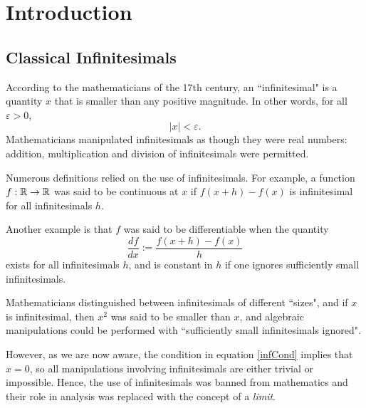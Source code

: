 
\chapter{Introduction} %

\label{Introduction} %



\section{Classical Infinitesimals}
According to the mathematicians of the 17th century, an ``infinitesimal"
is a quantity $x$ that is smaller than any positive magnitude. In other
words, for all $\varepsilon > 0$, 
\begin{equation}
\label{infCond}
    |x| < \varepsilon.
\end{equation}
Mathematicians manipulated infinitesimals
as though they were real numbers: addition, multiplication and division of infinitesimals
were permitted. 

Numerous definitions relied on the use of infinitesimals. For example,
a function $f:\mathbb{R}\rightarrow \mathbb{R}$ was said to be continuous at $x$
if $f(x+h)-f(x)$ is infinitesimal for all infinitesimals $h$.

Another example is that $f$ was said to be differentiable when the quantity
\begin{equation}
    \frac{df}{dx} := \frac{f(x+h)-f(x)}{h}
\end{equation}
exists for all infinitesimals $h$, and is constant in $h$ if one ignores
sufficiently small infinitesimals.

Mathematicians distinguished between infinitesimals of different ``sizes", 
and if $x$ is infinitesimal, then $x^2$ was said to be smaller than $x$,
and algebraic manipulations could be performed with ``sufficiently small
infinitesimals ignored".

However, as we are now aware, the condition in equation \ref{infCond} implies that $x = 0$, 
so all manipulations involving infinitesimals
are either trivial or impossible. Hence, the use 
of infinitesimals was banned from mathematics and their role
in analysis was replaced with the concept of a \emph{limit}.

